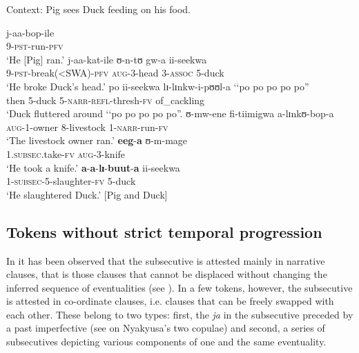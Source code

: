\pagebreak
\begin{exe}
\ex Context: Pig sees Duck feeding on his food.
\label{exSubsecPigDuckPeakWithSubsec}\begin{xlist}
\ex \label{exSubsecPigDuckPeakWithSubsecSentence1} \gll j-aa-bop-ile\\
9-\textsc{pst}-run-\textsc{pfv}\\
\glt \lq He [Pig] ran.'
\ex \label{exSubsecPigDuckPeakWithSubsecSentence2} \gll j-aa-kat-ile ʊ-n-tʊ gw-a ii-seekwa\\
9-\textsc{pst}-break(<SWA)-\textsc{pfv} \textsc{aug}-3-head 3-\textsc{assoc} 5-duck\\
\glt \lq He broke Duck's head.'
\ex \label{exSubsecPigDuckPeakWithSubsecSentence3} \gll po ii-seekwa lɪ-lɪnkw-i-pʊʊl-a \lq\lq{po po po po po}''\\
then 5-duck 5-\textsc{narr}-\textsc{refl}-thresh-\textsc{fv} \phantom{\lq\lq}of\_cackling\\
\glt \lq Duck fluttered around \lq \lq po po po po po''.
\ex \label{exSubsecPigDuckPeakWithSubsecSentence4} \gll ʊ-mw-ene fi-tiimigwa a-lɪnkʊ-bop-a\\
\textsc{aug}-1-owner 8-livestock 1-\textsc{narr}-run-\textsc{fv}\\
\glt `The livestock owner ran.'
\ex \label{exSubsecPigDuckPeakWithSubsecSentence5}\gll \textbf{eeg}-\textbf{a} ʊ-m-mage\\
1.\textsc{subsec}.take-\textsc{fv} \textsc{aug}-3-knife\\
\glt `He took a knife.'
\ex\label{exSubsecPigDuckPeakWithSubsecSentence6}\gll \textbf{a}-\textbf{a}-\textbf{lɪ}-\textbf{buut}-\textbf{a} ii-seekwa\\
1-\textsc{subsec}-5-slaughter-\textsc{fv} 5-duck \\
\glt `He slaughtered Duck.' [Pig and Duck]
\end{xlist}
\end{exe}

\subsection{Tokens without strict temporal progression}\label{SubsecutiveCounterExamples}
In  it has been observed that the subsecutive is attested mainly in narrative clauses, that is those clauses that cannot be displaced without changing the inferred sequence of eventualities (see ). In a few tokens, however, the subsecutive is attested in co-ordinate clauses, i.e. clauses that can be freely swapped with each other. These belong to two types: first, the  \textit{ja} in the subsecutive preceded by a past imperfective (see  on Nyakyusa's two copulae) and second, a series of subsecutives depicting various components of one and the same eventuality.

